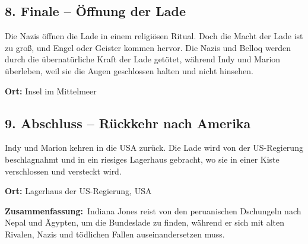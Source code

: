 \documentclass[a4paper]{article}
\begin{document}
\subsection*{8. Finale – Öffnung der Lade}
Die Nazis öffnen die Lade in einem religiösen Ritual. Doch die Macht der Lade ist zu groß, und Engel oder Geister kommen hervor. Die Nazis und Belloq werden durch die übernatürliche Kraft der Lade getötet, während Indy und Marion überleben, weil sie die Augen geschlossen halten und nicht hinsehen.
\begin{itemize}
  \begin{item}
    \textbf{Ort:} Insel im Mittelmeer
  \end{item}
\end{itemize}
\subsection*{9. Abschluss – Rückkehr nach Amerika}
Indy und Marion kehren in die USA zurück. Die Lade wird von der US-Regierung beschlagnahmt und in ein riesiges Lagerhaus gebracht, wo sie in einer Kiste verschlossen und versteckt wird.
\begin{itemize}
  \begin{item}
    \textbf{Ort:} Lagerhaus der US-Regierung, USA
  \end{item}
\end{itemize}
\textbf{Zusammenfassung:}\
Indiana Jones reist von den peruanischen Dschungeln nach Nepal und Ägypten, um die Bundeslade zu finden, während er sich mit alten Rivalen, Nazis und tödlichen Fallen auseinandersetzen muss.
\end{document}
